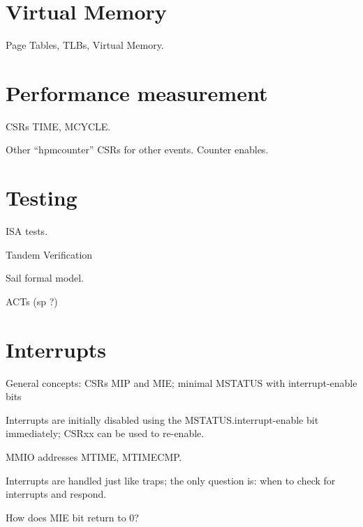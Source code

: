 
\section{Virtual Memory}

Page Tables, TLBs, Virtual Memory.


\section{Performance measurement}

CSRs TIME, MCYCLE.

Other ``hpmcounter'' CSRs for other events.
Counter enables.


\section{Testing}

ISA tests. 

Tandem Verification

Sail formal model.

ACTs (sp ?)


\section{Interrupts}

\begin{tightlist}
  \item General concepts: CSRs MIP and MIE; minimal MSTATUS with interrupt-enable bits

  \item Interrupts are initially disabled using the
        MSTATUS.interrupt-enable bit immediately; CSRxx can be used to
        re-enable.

  \item MMIO addresses MTIME, MTIMECMP.

  \item Interrupts are handled just like traps; the only question is:
        when to check for interrupts and respond.

  \item How does MIE bit return to 0?

\end{tightlist}

